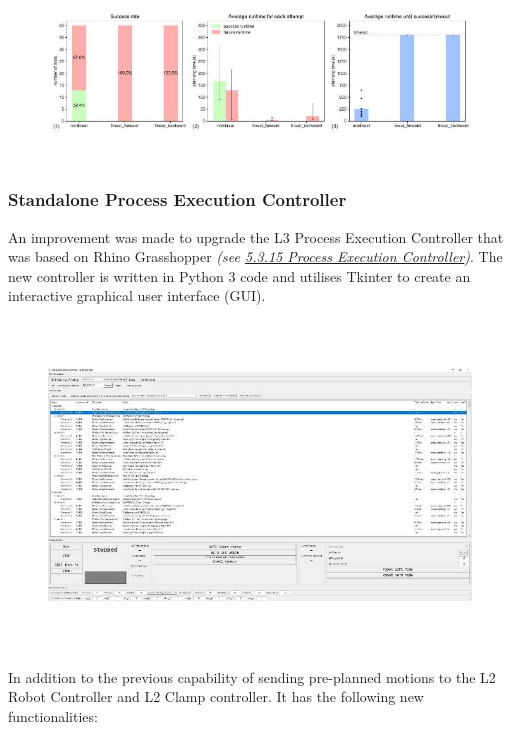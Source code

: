 \documentclass[11pt]{book}
\begin{document}
\begin{figure}[H]
\includegraphics[width=15.92cm,height=4.73cm]{./images/image64.jpeg}
\end{figure}


\vspace{1\baselineskip}
\subsubsection{Standalone Process Execution Controller}

An improvement was made to upgrade the L3 Process Execution Controller that was based on Rhino Grasshopper \textit{\textcolor[HTML]{B7B7B7}{(see \uline{5.3.15 Process Execution Controller})}}. The new controller is written in Python 3 code and utilises Tkinter to create an interactive graphical user interface (GUI).

\begin{figure}[H]
\includegraphics[width=15.92cm,height=8.71cm]{./images/image65.jpeg}
\end{figure}


In addition to the previous capability of sending pre-planned motions to the L2 Robot Controller and L2 Clamp controller. It has the following new functionalities:
\end{document}
